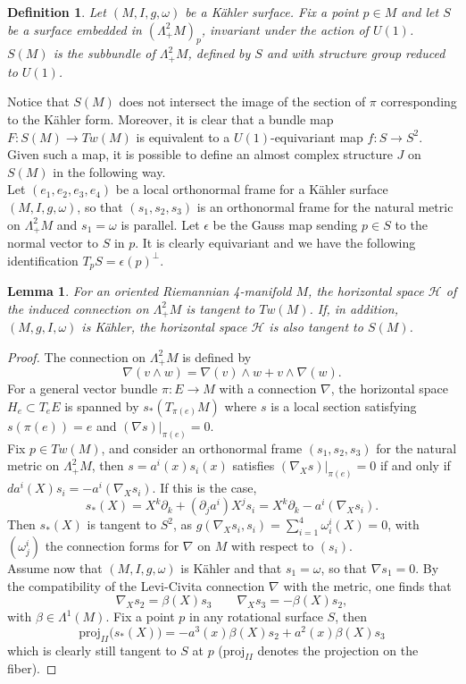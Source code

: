 \documentclass[11pt]{amsart}
\theoremstyle{definition}
\theoremstyle{plain}
\theoremstyle{definition}
\theoremstyle{plain}
\newtheorem{Lemma}[Def]{Lemma}
\newtheorem{Defin}[Def]{Definition}
\theoremstyle{remark}
\theoremstyle{plain}
\newcommand{\n}{\nabla}
\newcommand{\de}{\partial}
\begin{document}
\begin{Defin} \label{DedS(M)}  Let  $(M, I, g, \omega)$  be a K\"ahler surface.  Fix a point $p\in M$  and let $S$ be a surface embedded in $(\Lambda^2_+ M)_p$, invariant under the action of $U(1)$.  $S(M)$ is the  subbundle  of  $\Lambda^2_+ M$, defined by $S$ and  with structure group  reduced to $U(1)$.
\end{Defin}

Notice   that  $S(M)$ does not intersect the image of the section of $\pi$ corresponding to  the K\"ahler form.  
Moreover, it is clear that a bundle map $F:S(M) \to Tw(M)$ is equivalent to a $U(1)$-equivariant map $f: S\to S^2$. \\
Given such a map, it is possible to define an almost complex structure $J$ on $S(M)$ in the following way. \\
Let $(e_1, e_2, e_3, e_4)$ be a local orthonormal frame for  a K\"ahler surface  $(M,  I,  g, \omega)$, so that $(s_1, s_2, s_3)$ is an orthonormal frame for the natural metric on $\Lambda_+^2 M $ and $s_1 = \omega$ is parallel.
Let $\epsilon$ be the Gauss map sending $p\in S$ to the normal vector to $S$ in $p$. It is clearly equivariant and we have the following identification $T_p S=\epsilon(p)^{\perp}$.
\begin{Lemma} 
For an oriented Riemannian 4-manifold $M$,  the horizontal space $\mathcal{H}$ of the induced connection on $\Lambda_+^2 M $ is tangent to $Tw(M)$.    If,  in addition,  $(M,g, I, \omega) $ is K\"ahler, the horizontal space $\mathcal{H}$ is also  tangent to $S(M) $.
\end{Lemma}
\begin{proof}
	The connection on $\Lambda_+^2 M $ is defined by $$\n(v\wedge w)= \n(v)\wedge w+ v \wedge \n (w).$$ For a general vector bundle $\pi: E \to M$ with a connection $\n$, the horizontal space $H_e \subset T_eE $ is spanned by $s_*(T_{\pi(e)} M) $ where $s$ is a local section satisfying $s(\pi(e))=e$ and $(\n s)|_{\pi(e)} =0$. \\
	 Fix $p\in Tw(M) $, and consider an orthonormal frame $(s_1, s_2, s_3)$  for the natural metric on $\Lambda_+^2 M $,  then $s=a^i(x) s_i (x)$  satisfies $(\n_X s)|_{\pi(e)} =0$ if and only if $d a^i (X)s_i=- a^i (\n_X s_i) $. If this is the case, 
	\[
	s_*(X)=X^k \de_k +(\de_j  a^i) X^j s_i = X^k \de_k - a^i (\n_X s_i).
	\]
	Then $s_* (X) $ is tangent to $S^2$, as $g(\n_X s_i, s_i)=  \sum_{i=1}^4 \omega ^i_i (X)=0   $, with $(\omega ^i_j)$ the connection forms for $\n$ on $M$ with respect to $(s_i)$. \\
	Assume now  that  $(M, I, g, \omega)$ is K\"ahler and that $s_1 = \omega$,  so that $\n s_1 =0 $. By  the compatibility of the Levi-Civita connection  $\n$ with the metric, one finds that 
	\[
	\n_X s_2 =\beta(X) s_3 \qquad \n_X s_3 =-\beta(X) s_2,  
	\]
	with $\beta \in \Lambda^1(M)$. Fix a point $p$ in any rotational surface $S$, then 
	\[
	\text{proj}_{II}\big( s_*(X)\big)=-a^3(x) \beta(X) s_2 + a^2(x) \beta(X) s_3
	\]
	which is clearly still tangent to $S$ at $p$ ($\text{proj}_{II}$ denotes the projection on the fiber).
	\end{proof}
\end{document}
